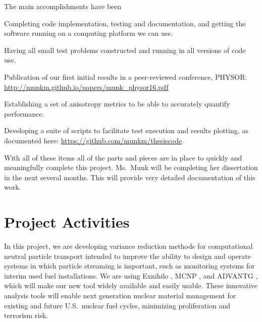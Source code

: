 \documentclass[12pt]{article}
\begin{document}
The main accomplishments have been 
\begin{compactitem}
\item Completing code implementation, testing and documentation, and getting the software running on a computing platform we can use.
\item Having all small test problems constructed and running in all versions of code use. 
\item Publication of our first initial results in a peer-reviewed conference, PHYSOR: \url{http://munkm.github.io/papers/munk\_physor16.pdf}
\item Establishing a set of anisotropy metrics to be able to accurately quantify performance. 
\item Developing a suite of scripts to facilitate test execution and results plotting, as documented here: \url{https://github.com/munkm/thesiscode}.
\end{compactitem}

With all of these items all of the parts and pieces are in place to quickly and meaningfully complete this project. 
Ms.\ Munk will be completing her dissertation in the next several months.
This will provide very detailed documentation of this work.



%
\section{Project Activities}
\label{sect::project}

In this project, we are developing variance reduction methods for computational neutral particle transport intended to improve the ability to design and operate systems in which particle streaming is important, such as monitoring systems for interim used fuel installations. 
We are using Exnihilo \cite{evans_denovo:_2010}, MCNP \cite{brown_mcnp_2002}, and ADVANTG \cite{mosher_new_2010}, which will make our new tool widely available and easily usable. 
These innovative analysis tools will enable next generation nuclear material management for existing and future U.S.\ nuclear fuel cycles, minimizing proliferation and terrorism risk.
\end{document}
